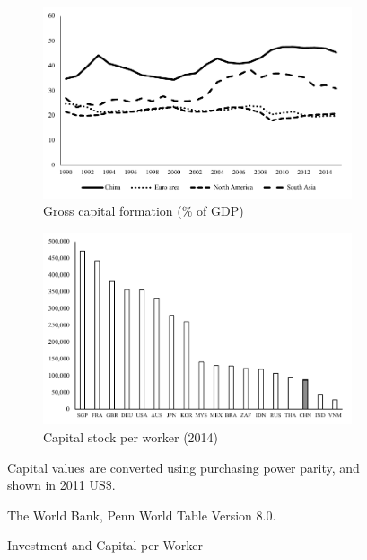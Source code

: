 \documentclass[AER]{AEA}
\begin{document}

\begin{figure}[!htb]
\centering
\begin{subfigure}{.5\textwidth}
\centering
\includegraphics[scale=.5]{fig/invest.pdf}
\caption{Gross capital formation (\% of GDP)}
\label{fig:invest}
\end{subfigure}%
\begin{subfigure}{.5\textwidth}
\centering
\includegraphics[scale=.5]{fig/capital-pc.pdf}
\caption{Capital stock per worker (2014)}
\label{fig:capital-pc}
\end{subfigure}
\caption{Investment and Capital per Worker}
\begin{figurenotes}
Capital values are converted using purchasing power parity, and shown in 2011 US\$. 
\end{figurenotes}
\begin{figurenotes}[Source]
The World Bank, Penn World Table Version 8.0.
\end{figurenotes}
\end{figure}
\end{document}
